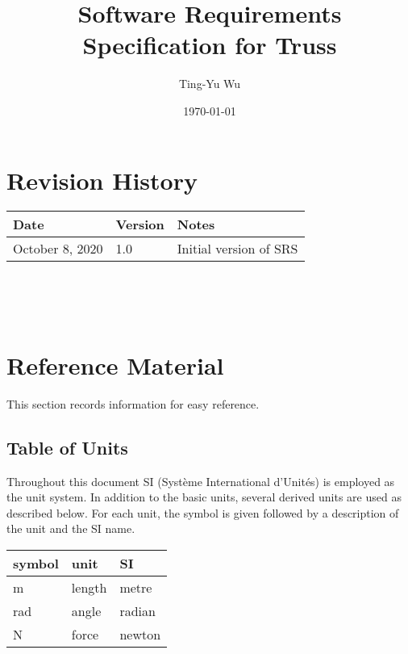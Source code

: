 \documentclass[12pt]{article}
\begin{document}
\title{Software Requirements Specification for Truss} 
\author{Ting-Yu Wu}
\date{\today}
	
\maketitle

\section*{Revision History}

\begin{tabularx}{\textwidth}{p{3cm}p{2cm}X}
	\toprule {\bf Date} & {\bf Version} & {\bf Notes}\\
	\midrule
	October 8, 2020 & 1.0 & Initial version of SRS\\
	\bottomrule
\end{tabularx}

~\newpage


\tableofcontents

~\newpage

\section{Reference Material}

This section records information for easy reference.

\subsection{Table of Units}

Throughout this document SI (Syst\`{e}me International d'Unit\'{e}s) is employed
as the unit system.  In addition to the basic units, several derived units are
used as described below.  For each unit, the symbol is given followed by a
description of the unit and the SI name.
~\newline

\renewcommand{\arraystretch}{1.2}
  \noindent \begin{tabular}{l l l} 
    \toprule		
    \textbf{symbol} & \textbf{unit} & \textbf{SI}\\
    \midrule 
    \si{\metre} & length & metre\\
    \si{\radian} & angle & radian\\
    \si{\newton} & force & newton\\
    \bottomrule
  \end{tabular}
\end{document}
